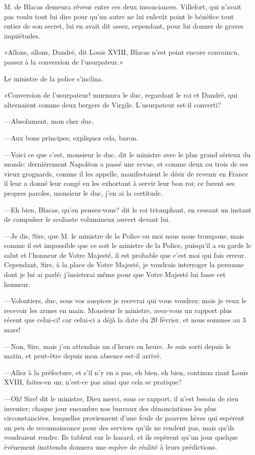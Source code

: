 M. de Blacas demeura rêveur entre ces deux insouciances. Villefort, qui n'avait pas voulu tout lui dire pour qu'un autre ne lui enlevât point le bénéfice tout entier de son secret, lui en avait dit assez, cependant, pour lui donner de graves inquiétudes.

«Allons, allons, Dandré, dit Louis XVIII, Blacas n'est point encore convaincu, passez à la conversion de l'usurpateur.»

Le ministre de la police s'inclina.

«Conversion de l'usurpateur! murmura le duc, regardant le roi et Dandré, qui alternaient comme deux bergers de Virgile. L'usurpateur est-il converti?

—Absolument, mon cher duc.

—Aux bons principes; expliquez cela, baron.

—Voici ce que c'est, monsieur le duc, dit le ministre avec le plus grand sérieux du monde: dernièrement Napoléon a passé une revue, et comme deux ou trois de ses vieux grognards, comme il les appelle, manifestaient le désir de revenir en France il leur a donné leur congé en les exhortant à servir leur bon roi; ce furent ses propres paroles, monsieur le duc, j'en ai la certitude.

—Eh bien, Blacas, qu'en pensez-vous? dit le roi triomphant, en cessant un instant de compulser le scoliaste volumineux ouvert devant lui.

—Je dis, Sire, que M. le ministre de la Police ou moi nous nous trompons; mais comme il est impossible que ce soit le ministre de la Police, puisqu'il a en garde le salut et l'honneur de Votre Majesté, il est probable que c'est moi qui fais erreur. Cependant, Sire, à la place de Votre Majesté, je voudrais interroger la personne dont je lui ai parlé; j'insisterai même pour que Votre Majesté lui fasse cet honneur.

—Volontiers, duc, sous vos auspices je recevrai qui vous voudrez; mais je veux le recevoir les armes en main. Monsieur le ministre, avez-vous un rapport plus récent que celui-ci! car celui-ci a déjà la date du 20 février, et nous sommes au 3 mars!

—Non, Sire, mais j'en attendais un d'heure en heure. Je suis sorti depuis le matin, et peut-être depuis mon absence est-il arrivé.

—Allez à la préfecture, et s'il n'y en a pas, eh bien, eh bien, continua riant Louis XVIII, faites-en un; n'est-ce pas ainsi que cela se pratique?

—Oh! Sire! dit le ministre, Dieu merci, sous ce rapport, il n'est besoin de rien inventer; chaque jour encombre nos bureaux des dénonciations les plus circonstanciées, lesquelles proviennent d'une foule de pauvres hères qui espèrent un peu de reconnaissance pour des services qu'ils ne rendent pas, mais qu'ils voudraient rendre. Ils tablent sur le hasard, et ils espèrent qu'un jour quelque événement inattendu donnera une espèce de réalité à leurs prédictions.

